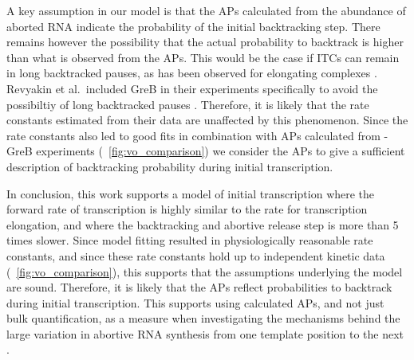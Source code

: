 A key assumption in our model is that the APs calculated from the abundance of
aborted RNA indicate the probability of the initial backtracking step. There
remains however the possibility that the actual probability to backtrack is
higher than what is observed from the APs. This would be the case if ITCs
can remain in long backtracked pauses, as has been observed for elongating
complexes \cite{shaevitz_backtracking_2003}. Revyakin et al.\
included GreB in their experiments specifically to avoid the possibiltiy of
long backtracked pauses \cite{revyakin_abortive_2006}. Therefore, it is
likely that the rate constants estimated from their data are unaffected by this
phenomenon. Since the rate constants also led to good fits in combination with
APs calculated from -GreB experiments (\FIG~\ref{fig:vo_comparison}) we
consider the APs to give a sufficient description of backtracking probability
during initial transcription.

In conclusion, this work supports a model of initial transcription where the
forward rate of transcription is highly similar to the rate for transcription
elongation, and where the backtracking and abortive release step is more than
5 times slower. Since model fitting resulted in physiologically reasonable
rate constants, and since these rate constants hold up to independent kinetic
data (\FIG~\ref{fig:vo_comparison}), this supports that the assumptions
underlying the model are sound. Therefore, it is likely that the APs reflect
probabilities to backtrack during initial transcription. This supports using
calculated APs, and not just bulk quantification, as a measure when
investigating the mechanisms behind the large variation in abortive RNA
synthesis from one template position to the next \cite{hsu_initial_2006}.
